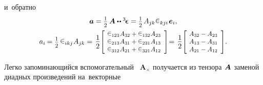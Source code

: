 \begin{otherlanguage}{russian}
\vspace{-0.5em} \noindent и~обратно
\vspace{-0.25em}\[\begin{array}{c}
\bm{a} = \smalldisplaystyleonehalf \, \bm{A} \dotdotp \levicivitatensor =
\smalldisplaystyleonehalf \hspace{.25ex} A_{jk} \levicivita_{kji} \hspace{.2ex} \bm{e}_i , \\[0.64em]
a_{i} \hspace{-0.16ex} = \smalldisplaystyleonehalf \hspace{.32ex} \levicivita_{ikj} \hspace{0.1ex} A_{jk} = \hspace{0.1em}
\displaystyle \onehalf \scalebox{0.9}[0.9]{$\left[\hspace{-0.25ex} \begin{array}{c}
\levicivita_{123} \hspace{0.1ex} A_{32} + \levicivita_{132} \hspace{0.1ex} A_{23} \\
\levicivita_{213} \hspace{0.1ex} A_{31} + \levicivita_{231} \hspace{0.1ex} A_{13} \\
\levicivita_{312} \hspace{0.1ex} A_{21} + \levicivita_{321} \hspace{0.1ex} A_{12}
\end{array} \right]$} \hspace{-0.2em} = \hspace{0.1em}
\displaystyle \onehalf \scalebox{0.9}[0.9]{$\left[\hspace{-0.3ex} \begin{array}{c}
A_{32} - A_{23} \\
A_{13} - A_{31} \\
A_{21} - A_{12}
\end{array} \right]$} .
\vspace{.1em}\end{array}\]

Легко запоминающийся вспомогательный ~${\!\bm{A}_{\!\bm{\times}}}$ получается из тензора~${\hspace{-0.2ex}\bm{A}}$ заменой диадных произведений на~векторные


\end{otherlanguage}
